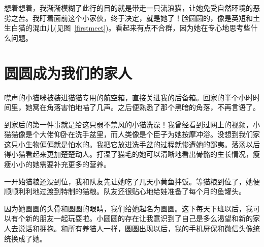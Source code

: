想着想着，我渐渐模糊了此行的目的就是带走一只流浪猫，让她免受自然环境的恶劣之苦。我盯着面前这个小家伙，终于决定，就是她了！脸圆圆的，像是英短和土生白猫的混血儿(见图~\ref{firstmeet})。看起来有点不合群，因为她在专心地思考些什么问题。

\section{圆圆成为我们的家人}
\label{sec:yuan-join-our-family}

噤声的小猫咪被装进猫猫专用的航空箱，直接关进我的后备箱。回家的半个小时时间里，她窝在角落害怕地喵了几声。之后便熟悉了那个黑暗的角落，不再言语了。

到家后的第一件事就是给这只弱不禁风的小猫洗澡！我曾经看到过网上的视频，小猫猫像是个大佬仰卧在洗手盆里，而人类像是个臣子为她按摩冲浴。没想到我们家这只小生物偏偏就是怕水的。我把它放进洗手盆的过程就惨遭她的鄙夷。落汤以后得小猫看起来更加楚楚动人。打湿了猫毛的她可以清晰地看出骨骼的生长情况，瘦瘦小小的她需要补充更多的营养。

一开始猫粮还没到位，我和队友先让她吃了几天小黄鱼拌饭。等猫粮到位了，她便顺顺利利地过渡到特制的猫粮。队友还很贴心地给娃准备了每个月的鱼罐头。

因为她圆圆的头骨和圆圆的眼睛，我们给她起名为圆圆。这下每天下班以后，我可以有个新的朋友一起玩耍啦。小圆圆的存在让我意识到了自己是多么渴望和新的家人去说话和拥抱。和所有养猫人一样，圆圆出现以后，我的手机屏保和微信头像统统换成了她。

